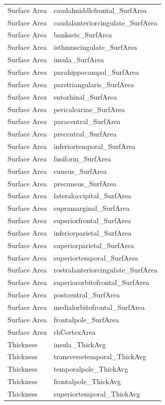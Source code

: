 \documentclass[pdflatex,sn-nature]{sn-jnl}%
\theoremstyle{thmstyleone}%
\theoremstyle{thmstyletwo}%
\theoremstyle{thmstylethree}%
\begin{document}
\begin{appendices}
\begin{small}
\begin{longtable}{l|l}
Surface Area & caudalmiddlefrontal\_SurfArea \\
Surface Area & caudalanteriorcingulate\_SurfArea \\
Surface Area & bankssts\_SurfArea \\
Surface Area & isthmuscingulate\_SurfArea \\
Surface Area & insula\_SurfArea \\
Surface Area & parahippocampal\_SurfArea \\
Surface Area & parstriangularis\_SurfArea \\
Surface Area & entorhinal\_SurfArea \\
Surface Area & pericalcarine\_SurfArea \\
Surface Area & paracentral\_SurfArea \\
Surface Area & precentral\_SurfArea \\
Surface Area & inferiortemporal\_SurfArea \\
Surface Area & fusiform\_SurfArea \\
Surface Area & cuneus\_SurfArea \\
Surface Area & precuneus\_SurfArea \\
Surface Area & lateraloccipital\_SurfArea \\
Surface Area & supramarginal\_SurfArea \\
Surface Area & superiorfrontal\_SurfArea \\
Surface Area & inferiorparietal\_SurfArea \\
Surface Area & superiorparietal\_SurfArea \\
Surface Area & superiortemporal\_SurfArea \\
Surface Area & rostralanteriorcingulate\_SurfArea \\
Surface Area & superiororbitofrontal\_SurfArea \\
Surface Area & postcentral\_SurfArea \\
Surface Area & medialorbitofrontal\_SurfArea \\
Surface Area & frontalpole\_SurfArea \\
Surface Area & rhCortexArea \\
\midrule
Thickness & insula\_ThickAvg \\
Thickness & transversetemporal\_ThickAvg \\
Thickness & temporalpole\_ThickAvg \\
Thickness & frontalpole\_ThickAvg \\
Thickness & superiortemporal\_ThickAvg \\

\end{longtable}
\end{small}
\end{appendices}
\end{document}
